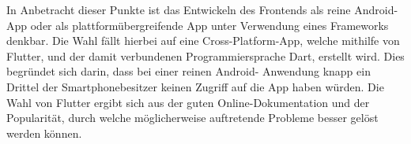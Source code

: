 In Anbetracht dieser Punkte ist das Entwickeln des Frontends als reine Android-App oder als plattformübergreifende App unter Verwendung eines Frameworks denkbar. Die Wahl fällt hierbei
auf eine Cross-Platform-App, welche mithilfe von Flutter, und der damit verbundenen Programmiersprache Dart, erstellt wird. Dies begründet sich darin, dass bei einer reinen Android-
Anwendung knapp ein Drittel der Smartphonebesitzer keinen Zugriff auf die App haben würden. Die Wahl von Flutter ergibt sich aus der guten Online-Dokumentation und der Popularität, 
durch welche möglicherweise auftretende Probleme besser gelöst werden können.